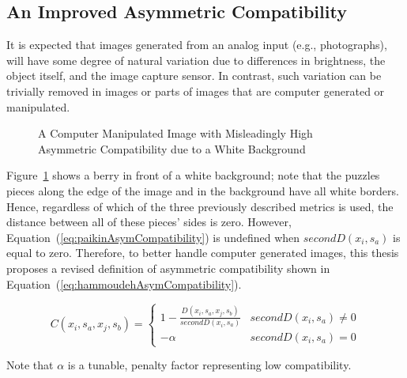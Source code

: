 \documentclass{report}
\def\eref#1{(\ref{#1})}
\begin{document}
\subsection{An Improved Asymmetric Compatibility}\label{sec:hammoudehPairwiseAffinity}

It is expected that images generated from an analog input (e.g., photographs), will have some degree of natural variation due to differences in brightness, the object itself, and the image capture sensor.  In contrast, such variation can be trivially removed in images or parts of images that are computer generated or manipulated.

\begin{figure}
\centering
{}
\caption{A Computer Manipulated Image with Misleadingly High Asymmetric Compatibility due to a White Background}
\label{fig:objectWhiteBackground}
\end{figure}

Figure~\ref{fig:objectWhiteBackground} shows a berry in front of a white background; note that the puzzles pieces along the edge of the image and in the background have all white borders.  Hence, regardless of which of the three previously described metrics is used, the distance between all of these pieces' sides is zero. However, Equation~\eref{eq:paikinAsymCompatibility} is undefined when $secondD(x_i,s_a)$ is equal to zero.  Therefore, to better handle computer generated images, this thesis proposes a revised definition of asymmetric compatibility shown in Equation~\eref{eq:hammoudehAsymCompatibility}.  

\begin{equation} \label{eq:hammoudehAsymCompatibility}
C(x_i,s_a,x_j,s_b)= \begin{cases} 
	1 - \frac{D(x_i,s_a,x_j,s_b)}{secondD(x_i,s_a)} & secondD(x_i,s_a) \ne 0
\\
	-\alpha & secondD(x_i,s_a) = 0
\end{cases} 
\end{equation}

\noindent
Note that $\alpha$ is a tunable, penalty factor representing low compatibility.
\end{document}

